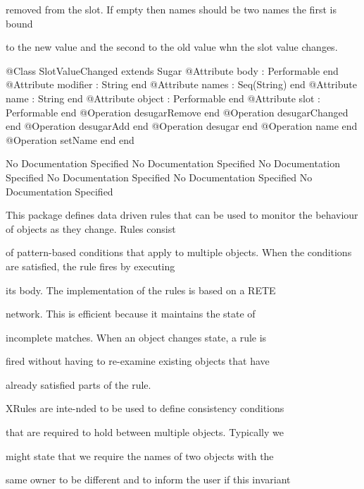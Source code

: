         removed from the slot. If empty then names should be two names the first is bound

        to the new value and the second to the old value whn the slot value changes.
\begin{Interface}
@Class SlotValueChanged extends Sugar
  @Attribute body : Performable end
  @Attribute modifier : String end
  @Attribute names : Seq(String) end
  @Attribute name : String end
  @Attribute object : Performable end
  @Attribute slot : Performable end
  @Operation desugarRemove end
  @Operation desugarChanged end
  @Operation desugarAdd end
  @Operation desugar end
  @Operation name end
  @Operation setName end
end
\end{Interface}
No Documentation Specified
No Documentation Specified
No Documentation Specified
No Documentation Specified
No Documentation Specified
No Documentation Specified

      This package defines data driven rules that can be used to 
      monitor the behaviour of objects as they change. Rules consist

      of pattern-based conditions that apply to multiple objects.
      When the conditions are satisfied, the rule fires by executing

      its body. The implementation of the rules is based on a RETE

      network. This is efficient because it maintains the state of

      incomplete matches. When an object changes state, a rule is

      fired without having to re-examine existing objects that have

      already satisfied parts of the rule.
      
      XRules are inte-nded to be used to define consistency conditions

      that are required to hold between multiple objects. Typically we

      might state that we require the names of two objects with the

      same owner to be different and to inform the user if this invariant

